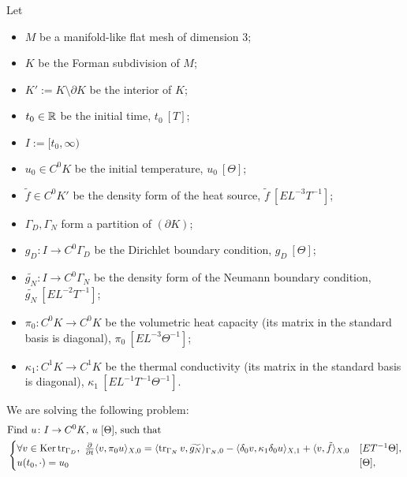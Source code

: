 \begin{formulation}
  Let
  \begin{itemize}
    \item
      $M$ be a manifold-like flat mesh of dimension $3$;
    \item
      $K$ be the Forman subdivision of $M$;
    \item
      $K' := K \setminus \partial K$ be the interior of $K$;
    \item
      $t_0 \in \mathbb{R}$ be the initial time, $t_0\ [T]$;
    \item
      $I := [t_0, \infty)$
    \item
      $u_0 \in C^0 K$ be the initial temperature, $u_0\ [\Theta]$;
    \item
      $\tilde{f} \in C^0 K'$ be the density form of the heat source,
      $\tilde{f}\ [E L^{-3} T^{-1}]$;
    \item
      $\Gamma_D, \Gamma_N$ form a partition of $(\partial K)$;
    \item
      $g_D \colon I \to C^0 \Gamma_D$
      be the Dirichlet boundary condition, $g_D\ [\Theta]$;
    \item
      $\widetilde{g_N} \colon I \to C^0 \Gamma_N$
      be the density form of the Neumann boundary condition,
      $\widetilde{g_N}\ [E L^{-2} T^{-1}]$;
    \item
      $\pi_0 \colon C^0 K \to C^0 K$ be the volumetric heat capacity
      (its matrix in the standard basis is diagonal),
      $\pi_0\ [E L^{-3} \Theta^{-1}]$;
    \item
      $\kappa_1 \colon C^1 K \to C^1 K$ be the thermal conductivity
      (its matrix in the standard basis is diagonal),
      $\kappa_1\ [E L^{-1} T^{-1} \Theta^{-1}]$.
  \end{itemize}
  We are solving the following problem:
  \begin{equation}
    \begin{split}
      & \text{Find $u \colon I \to C^0 K$, $u\ [\Theta]$, such that} \\
      &
      \begin{cases}
        \forall v \in \mathop{\rm Ker}\nolimits \mathop{\rm tr}\nolimits_{\Gamma_D},\
          \frac{\partial}{\partial t} \langle v,\pi_0 u\rangle_{X, 0} =
            \langle\mathop{\rm tr}\nolimits_{\Gamma_N} v,\widetilde{g_N}\rangle_{\Gamma_N, 0}
          - \langle\delta_0 v,\kappa_1 \delta_0 u\rangle_{X, 1}
          + \langle v,\tilde{f}\rangle_{X, 0}
        & [E T^{-1} \Theta], \\
        u(t_0, \cdot) = u_0 & [\Theta], \\

\end{cases}
\end{split}
\end{equation}
\end{formulation}
